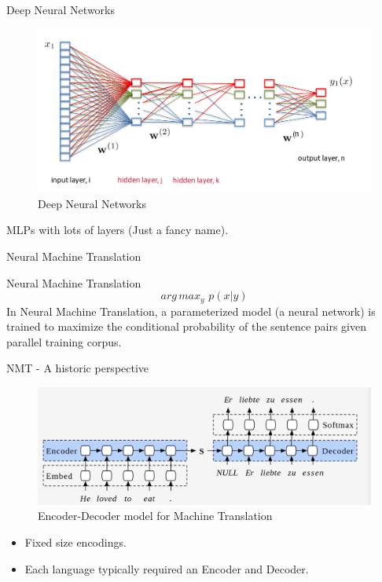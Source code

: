 ﻿\documentclass[aspectratio=43,mathserif,xcolor={usenames,dvipsnames,svgnames,table},10pt]{beamer}
\begin{document}
\begin{frame}{Deep Neural Networks}
 \begin{figure}[h]
    \includegraphics[width=0.7\linewidth]{images/dnn.png}  
    \caption{Deep Neural Networks}
  \end{figure}
  MLPs with lots of layers (Just a fancy name).
\end{frame}


\begin{section}{Neural Machine Translation}
\end{section}

\begin{frame}{Neural Machine Translation}
 $$ arg\,max _{y}  \,\, p(x|y)$$
 In Neural Machine Translation, a parameterized model (a neural network) is trained to maximize the conditional probability of the sentence pairs given parallel training corpus.
\end{frame}

\begin{frame}{NMT - A historic perspective}
  \begin{figure}[h]
    \includegraphics[width=0.9\linewidth]{images/enc_dec.png}  
    \caption{Encoder-Decoder model for Machine Translation}
  \end{figure}
\begin{itemize}
 \item Fixed size encodings.
 \item Each language typically required an Encoder and Decoder.
\end{itemize}
\end{frame}
\end{document}
